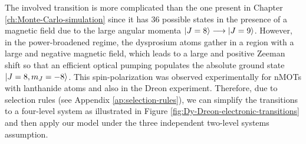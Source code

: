 The involved transition is more complicated than the one present in Chapter \ref{ch:Monte-Carlo-simulation} since it has 36 possible states in the presence of a magnetic field due to the large angular momenta $ \ket{J = 8} \longrightarrow \ket{J = 9} $. However, in the power-broadened regime, the dysprosium atoms gather in a region with a large and negative magnetic field, which leads to a large and positive Zeeman shift so that an efficient optical pumping populates the absolute ground state $ \ket{J = 8, m_J = -8} $. This spin-polarization was observed experimentally for nMOTs with lanthanide atoms \cite{lu2011strongly,aikawa2012bose} and also in the Dreon experiment. Therefore, due to selection rules (see Appendix \ref{ap:selection-rules}), we can simplify the transitions to a four-level system as illustrated in Figure \ref{fig:Dy-Dreon-electronic-transitions} and then apply our model under the three independent two-level systems assumption.


